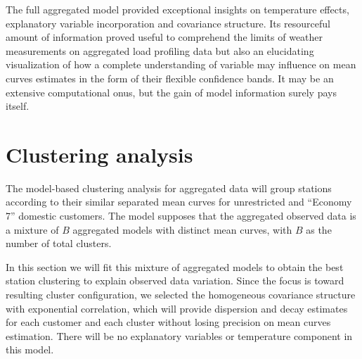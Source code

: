 The full aggregated model provided exceptional insights on temperature effects, explanatory variable incorporation and covariance structure. Its resourceful amount of information proved useful to comprehend the limits of weather measurements on aggregated load profiling data but also an elucidating visualization of how a complete understanding of variable may influence on mean curves estimates in the form of their flexible confidence bands. It may be an extensive computational onus, but the gain of model information surely pays itself.
















\section{Clustering analysis}
\label{sec:gavin-cluster}


The model-based clustering analysis for aggregated data will group stations according to their similar separated mean curves for unrestricted and ``Economy 7'' domestic customers. The model supposes that the aggregated observed data is a mixture of $B$ aggregated models with distinct mean curves, with $B$ as the number of total clusters.

In this section we will fit this mixture of aggregated models to obtain the best station clustering to explain observed data variation. Since the focus is toward resulting cluster configuration, we selected the homogeneous covariance structure with exponential correlation, which will provide dispersion and decay estimates for each customer and each cluster without losing precision on mean curves estimation. There will be no explanatory variables or temperature component in this model.

